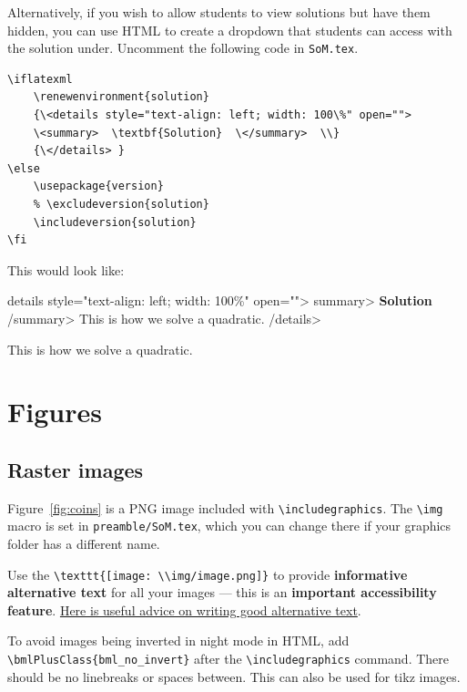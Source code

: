 Alternatively, if you wish to allow students to view solutions but have them hidden, you can use HTML to create a dropdown that students can access with the solution under. Uncomment the following code in \verb|SoM.tex|.

\begin{lstlisting}
\iflatexml  
    \renewenvironment{solution} 
    {\<details style="text-align: left; width: 100\%" open="">  
    \<summary>  \textbf{Solution}  \</summary>  \\} 
    {\</details> } 
\else 
    \usepackage{version}  
    % \excludeversion{solution}  
    \includeversion{solution}  
\fi 
\end{lstlisting}

This would look like:

\iflatexml  
\<details style="text-align: left; width: 100\%" open="">  \<summary>  \textbf{Solution}  \</summary>  This is how we solve a quadratic.  
    \</details> 
\else 
    \begin{solution}
        This is how we solve a quadratic. 
    \end{solution} 
\fi 




\section{Figures}
\label{demo:fig}

\subsection{Raster images}
\label{demo:fig:raster}

Figure~\ref{fig:coins} is a PNG image included with \verb|\includegraphics|. The \verb|\img| macro is set in \verb|preamble/SoM.tex|, which you can change there if your graphics folder has a different name.

Use the \verb|\texttt{[image: \\img/image.png]}| to provide \textbf{informative alternative text} for all your images --- this is an \textbf{important accessibility feature}. \href{https://accessibility.huit.harvard.edu/describe-content-images}{Here is useful advice on writing good alternative text}.

To avoid images being inverted in night mode in HTML, add \verb|\bmlPlusClass{bml_no_invert}| after the \verb|\includegraphics| command. There should be no linebreaks or spaces between. This can also be used for tikz images.

